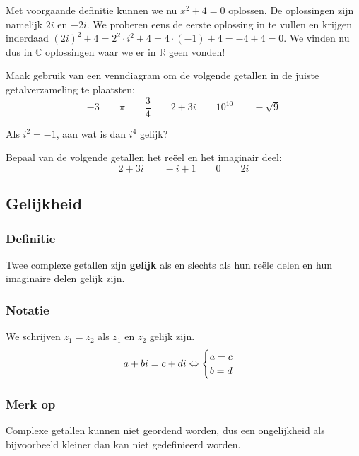 \documentclass[12pt,twoside,a4paper]{article}
\begin{document}
Met voorgaande definitie kunnen we nu $x^2+4=0$ oplossen. De oplossingen zijn namelijk $2i$ en $-2i$. We proberen eens de eerste oplossing in te vullen en krijgen inderdaad $(2i)^2+4 = 2^2\cdot i^2 + 4 = 4\cdot(-1) + 4 = -4 + 4 = 0$. We vinden nu dus in $\mathbb{C}$ oplossingen waar we er in $\mathbb{R}$ geen vonden!

\begin{oefening}
  Maak gebruik van een venndiagram om de volgende getallen in de juiste getalverzameling te plaatsten:
  $$-3\qquad\pi\qquad\dfrac{3}{4}\qquad2+3i\qquad10^{10}\qquad-\sqrt{9}$$
\end{oefening}

\begin{oefening}
  Als $i^2=-1$, aan wat is dan $i^4$ gelijk?
\end{oefening}

\begin{oefening}
  Bepaal van de volgende getallen het reëel en het imaginair deel:
  $$2+3i\qquad -i+1\qquad 0 \qquad 2i$$
\end{oefening}

\subsection{Gelijkheid}

\subsubsection*{Definitie}
\begin{mdframed}
Twee complexe getallen zijn {\bf gelijk} als en slechts als hun reële delen en hun imaginaire delen gelijk zijn.
\end{mdframed}

\subsubsection*{Notatie}
We schrijven $z_1=z_2$ als $z_1$ en $z_2$ gelijk zijn.
$$a+bi = c+di \Leftrightarrow \begin{cases}a=c \\ b=d\end{cases}$$

\subsubsection*{Merk op}
Complexe getallen kunnen niet geordend worden, dus een ongelijkheid als bijvoorbeeld kleiner dan kan niet gedefinieerd worden.
\end{document}
